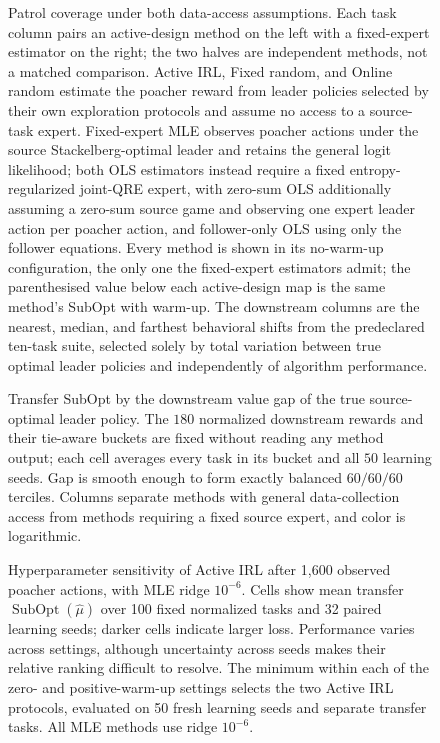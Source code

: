 \begin{figure}[t]
  \centering
  \caption{Patrol coverage under both data-access assumptions. Each task column
  pairs an active-design method on the left with a fixed-expert estimator on the
  right; the two halves are independent methods, not a matched comparison.
  Active IRL, Fixed random, and Online random estimate the poacher reward from
  leader policies selected by their own exploration protocols and assume no
  access to a source-task expert. Fixed-expert MLE observes poacher actions
  under the source Stackelberg-optimal leader and retains the general logit
  likelihood; both OLS estimators instead require a fixed
  entropy-regularized joint-QRE expert, with zero-sum OLS additionally assuming
  a zero-sum source game and observing one expert leader action per poacher
  action, and follower-only OLS using only the follower equations. Every method
  is shown in its no-warm-up configuration, the only one the fixed-expert
  estimators admit; the parenthesised value below each active-design map is the
  same method's SubOpt with warm-up. The downstream columns are the nearest, median, and
  farthest behavioral shifts from the predeclared ten-task suite, selected
  solely by total variation between true optimal leader policies and
  independently of algorithm performance.}
  \label{fig:appendix-lobeke-transfer}
\end{figure}

\begin{figure}[p]
  \centering
  \resizebox{\textwidth}{!}{%
  }
  \caption{Transfer SubOpt by the downstream value gap of the true
  source-optimal leader policy. The $180$ normalized downstream rewards and
  their tie-aware buckets are fixed without reading any method output; each
  cell averages every task in its bucket and all $50$ learning seeds. Gap is
  smooth enough to form exactly balanced $60/60/60$ terciles. Columns separate
  methods with general data-collection access from methods requiring a fixed
  source expert, and color is logarithmic.}
  \label{fig:appendix-lobeke-behavioral-transfer-gap}
\end{figure}

\begin{figure}[t]
  \centering
  \resizebox{\textwidth}{!}{%
  }
  \caption{Hyperparameter sensitivity of Active IRL after 1,600 observed
  poacher actions, with MLE ridge $10^{-6}$. Cells show mean transfer
  $\operatorname{SubOpt}(\hat\mu)$ over 100 fixed normalized tasks and 32 paired
  learning seeds; darker cells indicate larger loss. Performance varies across
  settings, although uncertainty across seeds makes their relative ranking
  difficult to resolve. The minimum within each of the zero- and positive-warm-up settings selects
  the two Active IRL protocols, evaluated on 50 fresh learning seeds and separate
  transfer tasks. All MLE methods use ridge $10^{-6}$.}
  \label{fig:appendix-lobeke-hyperparameters}
\end{figure}

